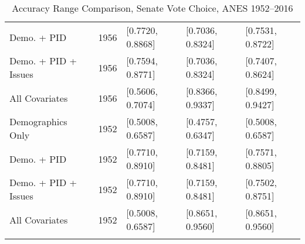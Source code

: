 \begin{longtable}{lrlll}
  Demo. + PID & 1956 & [0.7720, 0.8868] & [0.7036, 0.8324] & [0.7531, 0.8722] \\ 
  Demo. + PID + Issues & 1956 & [0.7594, 0.8771] & [0.7036, 0.8324] & [0.7407, 0.8624] \\ 
  All Covariates & 1956 & [0.5606, 0.7074] & [0.8366, 0.9337] & [0.8499, 0.9427] \\ 
  Demographics Only & 1952 & [0.5008, 0.6587] & [0.4757, 0.6347] & [0.5008, 0.6587] \\ 
  Demo. + PID & 1952 & [0.7710, 0.8910] & [0.7159, 0.8481] & [0.7571, 0.8805] \\ 
  Demo. + PID + Issues & 1952 & [0.7710, 0.8910] & [0.7159, 0.8481] & [0.7502, 0.8751] \\ 
  All Covariates & 1952 & [0.5008, 0.6587] & [0.8651, 0.9560] & [0.8651, 0.9560] \\ 
   \bottomrule
\caption{Accuracy Range Comparison, Senate Vote Choice, ANES 1952--2016} 
\label{tab:ANES_senate_accuracy}
\end{longtable}
